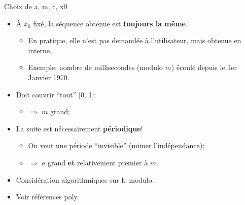 \documentclass[ignorenonframetext,]{beamer}
\providecommand{\tightlist}{%
  \setlength{\itemsep}{0pt}\setlength{\parskip}{0pt}}
\begin{document}
\begin{frame}{Choix de a, m, c, x0}
\protect\hypertarget{choix-de-a-m-c-x0}{}

\begin{itemize}
\tightlist
\item
  À \(x_0\) fixé, la séquence obtenue est \textbf{toujours la même}.

  \begin{itemize}
  \tightlist
  \item
    En pratique, elle n'est pas demandée à l'utilisateur, mais obtenue
    en interne.
  \item
    Exemple: nombre de millisecondes (modulo \(m\)) écoulé depuis le 1er
    Janvier 1970.\pause
  \end{itemize}
\item
  Doit couvrir ``tout'' {[}0, 1{]}:

  \begin{itemize}
  \tightlist
  \item
    \(\Rightarrow\) \(m\) grand; \pause
  \end{itemize}
\item
  La suite est nécessairement \textbf{périodique}!

  \begin{itemize}
  \tightlist
  \item
    On veut une période ``invisible'' (mimer l'indépendance);
  \item
    \(\Rightarrow\) \(a\) grand \textbf{et} relativement premier à
    \(m\).\pause
  \end{itemize}
\item
  Considération algorithmiques sur le modulo.
\item
  Voir références poly.
\end{itemize}

\end{frame}
\end{document}
